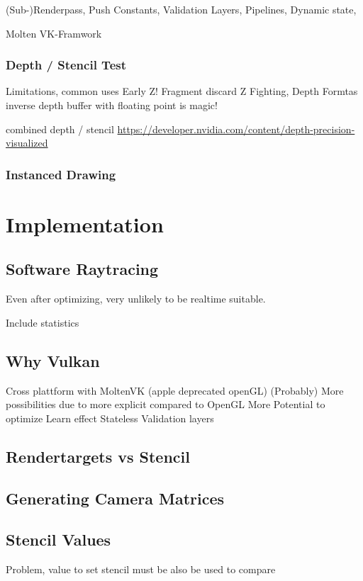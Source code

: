 (Sub-)Renderpass, Push Constants, Validation Layers, Pipelines, Dynamic state,

Molten VK-Framwork

\subsubsection{Depth / Stencil Test}
Limitations, common uses
Early Z! Fragment discard
Z Fighting,
Depth Formtas
inverse depth buffer with floating point is magic!

combined depth / stencil
\url{https://developer.nvidia.com/content/depth-precision-visualized}


\subsubsection{Instanced Drawing}

\section{Implementation}

\subsection{Software Raytracing}
Even after optimizing, very unlikely to be realtime suitable. 

Include statistics

\subsection{Why Vulkan}
Cross plattform with MoltenVK (apple deprecated openGL)
(Probably) More possibilities due to more explicit compared to OpenGL
More Potential to optimize
Learn effect
Stateless
Validation layers

\subsection{Rendertargets vs Stencil}

\subsection{Generating Camera Matrices}

\subsection{Stencil Values}
Problem, value to set stencil must be also be used to compare

